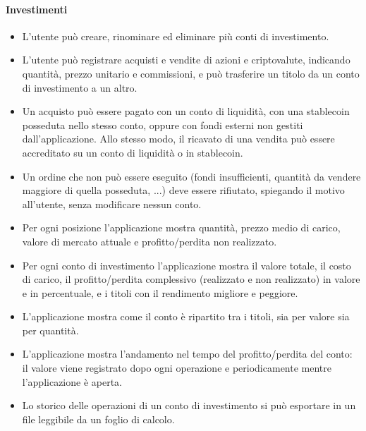 \documentclass[11pt,a4paper,openright]{report}
\begin{document}
\paragraph{Investimenti}
\begin{itemize}
  \item L'utente può creare, rinominare ed eliminare più conti di investimento.
  \item L'utente può registrare acquisti e vendite di azioni e criptovalute, indicando quantità, prezzo
  unitario e commissioni, e può trasferire un titolo da un conto di investimento a un altro.
  \item Un acquisto può essere pagato con un conto di liquidità, con una stablecoin posseduta nello stesso
  conto, oppure con fondi esterni non gestiti dall'applicazione. Allo stesso modo, il ricavato di una
  vendita può essere accreditato su un conto di liquidità o in stablecoin.
  \item Un ordine che non può essere eseguito (fondi insufficienti, quantità da vendere maggiore di quella
  posseduta, ...) deve essere rifiutato, spiegando il motivo all'utente, senza modificare nessun conto.
  \item Per ogni posizione l'applicazione mostra quantità, prezzo medio di carico, valore di mercato
  attuale e profitto/perdita non realizzato.
  \item Per ogni conto di investimento l'applicazione mostra il valore totale, il costo di carico, il
  profitto/perdita complessivo (realizzato e non realizzato) in valore e in percentuale, e i titoli con il
  rendimento migliore e peggiore.
  \item L'applicazione mostra come il conto è ripartito tra i titoli, sia per valore sia per quantità.
  \item L'applicazione mostra l'andamento nel tempo del profitto/perdita del conto: il valore viene
  registrato dopo ogni operazione e periodicamente mentre l'applicazione è aperta.
  \item Lo storico delle operazioni di un conto di investimento si può esportare in un file leggibile da
  un foglio di calcolo.
\end{itemize}
\end{document}
